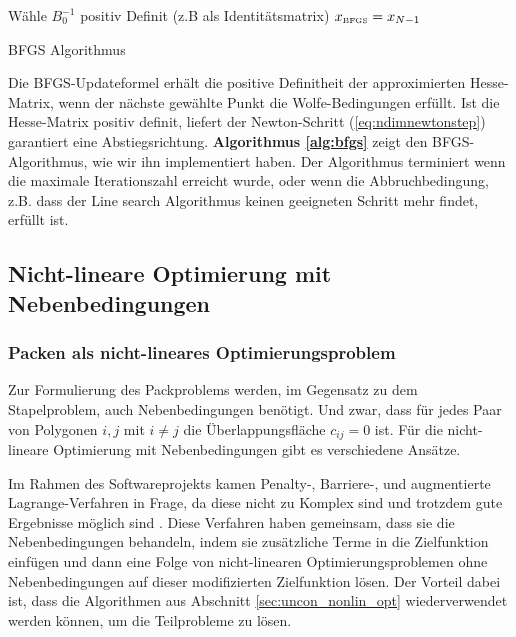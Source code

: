 \documentclass[runningheads,a4paper]{llncs}
\begin{document}
\begin{algorithm}[H]
\DontPrintSemicolon{}
\SetAlgoLined
{}
\BlankLine{}
Wähle $B_0^{-1}$ positiv Definit (z.B als Identitätsmatrix)\;
\ForEach{$i \in [0,N)$}{
Berechne $s_i = - B_i^{-1} f'(x_i)$.\;
Wähle $\alpha$ mit \textbf{Algorithmus \ref{alg:linesearch}}\;
\If{Abbruchbedingung erreicht}{
\KwRet $x_{\text{\tiny{BFGS}}} = x_i$\;
}
$x_{i+1} \leftarrow x_i + \alpha s_i$.\;
Berechne $B_{i+1}^{-1}$ nach Formel (\ref{eq:bfgsinverse})\;
}
\KwRet $x_{\text{\tiny{BFGS}}} = x_{N-1}$\;
\caption{BFGS Algorithmus}
\label{alg:bfgs}
\end{algorithm}
\vspace{1.5em}
Die BFGS-Updateformel erhält die positive Definitheit der approximierten Hesse-Matrix, wenn der nächste gewählte Punkt die Wolfe-Bedingungen erfüllt. Ist die Hesse-Matrix positiv definit, liefert der Newton-Schritt (\ref{eq:ndimnewtonstep}) garantiert eine Abstiegsrichtung. \textbf{Algorithmus \ref{alg:bfgs}} zeigt den BFGS-Algorithmus, wie wir ihn implementiert haben.
Der Algorithmus terminiert wenn die maximale Iterationszahl erreicht wurde, oder wenn die Abbruchbedingung, z.B. dass der Line search Algorithmus keinen geeigneten Schritt mehr findet, erfüllt ist.

\subsection{Nicht-lineare Optimierung mit Nebenbedingungen}
\label{sec:cons_nonlin_opt}

\subsubsection{Packen als nicht-lineares Optimierungsproblem}
Zur Formulierung des Packproblems werden, im Gegensatz zu dem Stapelproblem, auch Nebenbedingungen benötigt. Und zwar, dass für jedes Paar von Polygonen $i,j$ mit $i \neq j$ die Überlappungsfläche $c_{ij}=0$ ist. Für die nicht-lineare Optimierung mit Nebenbedingungen gibt es verschiedene Ansätze.

\begin{sloppypar}
Im Rahmen des Softwareprojekts kamen Penalty-, Barriere-, und augmentierte Lagrange-Verfahren in Frage, da diese nicht zu Komplex sind und trotzdem gute Ergebnisse möglich sind \cite{nocedal1999numerical}. Diese Verfahren haben gemeinsam, dass sie die Nebenbedingungen behandeln, indem sie zusätzliche Terme in die Zielfunktion einfügen und dann eine Folge von nicht-linearen Optimierungsproblemen ohne Nebenbedingungen auf dieser modifizierten Zielfunktion lösen. Der Vorteil dabei ist, dass die Algorithmen aus Abschnitt \ref{sec:uncon_nonlin_opt} wiederverwendet werden können, um die Teilprobleme zu lösen.
\end{sloppypar}
\end{document}
